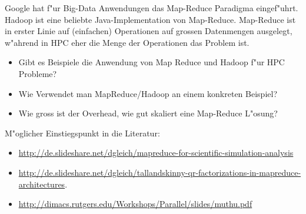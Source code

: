 \begin{aufgabe}
Google hat f"ur Big-Data Anwendungen das Map-Reduce Paradigma
eingef"uhrt.
Hadoop ist eine beliebte Java-Implementation von Map-Reduce.
Map-Reduce ist in erster Linie auf (einfachen) Operationen auf 
grossen Datenmengen ausgelegt, w"ahrend in HPC eher die Menge der
Operationen das Problem ist.
\begin{itemize}
\item Gibt es Beispiele die Anwendung von Map Reduce und Hadoop f"ur
HPC Probleme?
\item Wie Verwendet man MapReduce/Hadoop an einem konkreten Beispiel?
\item Wie gross ist der Overhead, wie gut skaliert eine Map-Reduce L"osung?
\end{itemize}
\end{aufgabe}

M"oglicher Einstiegspunkt in die Literatur:
\begin{itemize}
\item
\url{http://de.slideshare.net/dgleich/mapreduce-for-scientific-simulation-analysis} 
\item
\url{http://de.slideshare.net/dgleich/tallandskinny-qr-factorizations-in-mapreduce-architectures}.
\item
\url{http://dimacs.rutgers.edu/Workshops/Parallel/slides/muthu.pdf}
\end{itemize}

